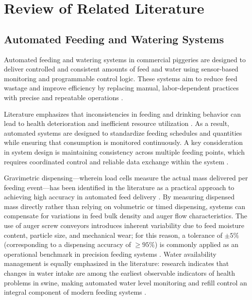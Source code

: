 
\chapter{Review of Related Literature}

\section{Automated Feeding and Watering Systems}

Automated feeding and watering systems in commercial piggeries are designed to deliver controlled and consistent amounts of feed and water using sensor-based monitoring and programmable control logic. These systems aim to reduce feed wastage and improve efficiency by replacing manual, labor-dependent practices with precise and repeatable operations \cite{adeoye2025animalia, beyondtech2025smart, arguta2024iop, dambaulova2023benefits}.

Literature emphasizes that inconsistencies in feeding and drinking behavior can lead to health deterioration and inefficient resource utilization \cite{oecdfao2025outlook, livestockproduction2026, derouchey2010feeding}. As a result, automated systems are designed to standardize feeding schedules and quantities while ensuring that consumption is monitored continuously. A key consideration in system design is maintaining consistency across multiple feeding points, which requires coordinated control and reliable data exchange within the system \cite{arguta2024iop, dambaulova2023benefits}.

Gravimetric dispensing---wherein load cells measure the actual mass delivered per feeding event---has been identified in the literature as a practical approach to achieving high accuracy in automated feed delivery \cite{tangorra2018energy, dambaulova2023benefits}. By measuring dispensed mass directly rather than relying on volumetric or timed dispensing, systems can compensate for variations in feed bulk density and auger flow characteristics. The use of auger screw conveyors introduces inherent variability due to feed moisture content, particle size, and mechanical wear; for this reason, a tolerance of $\pm 5\%$ (corresponding to a dispensing accuracy of $\geq 95\%$) is commonly applied as an operational benchmark in precision feeding systems \cite{tangorra2018energy, adeoye2025animalia}. Water availability management is equally emphasized in the literature: research indicates that changes in water intake are among the earliest observable indicators of health problems in swine, making automated water level monitoring and refill control an integral component of modern feeding systems \cite{whitney2018water, samuel2025water, derouchey2010feeding}.


